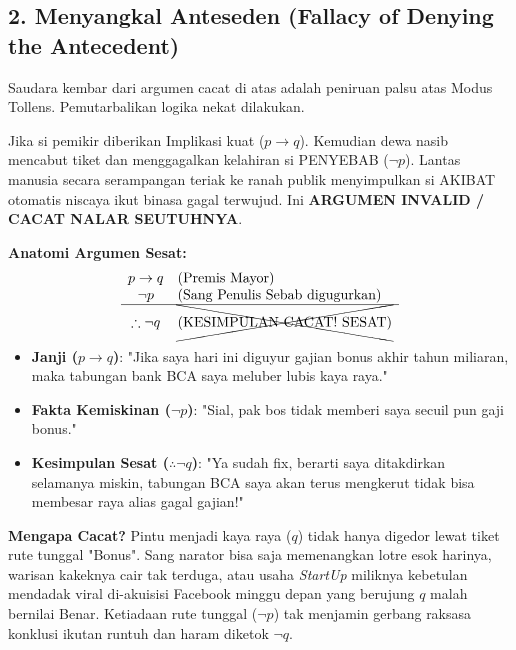 \subsection{2. Menyangkal Anteseden (Fallacy of Denying the Antecedent)}

Saudara kembar dari argumen cacat di atas adalah peniruan palsu atas Modus Tollens. Pemutarbalikan logika nekat dilakukan.

\begin{teorema}
Jika si pemikir diberikan Implikasi kuat ($p \rightarrow q$). Kemudian dewa nasib mencabut tiket dan menggagalkan kelahiran si PENYEBAB ($\neg p$). Lantas manusia secara serampangan teriak ke ranah publik menyimpulkan si AKIBAT otomatis niscaya ikut binasa gagal terwujud. Ini \textbf{ARGUMEN INVALID / CACAT NALAR SEUTUHNYA}.
\end{teorema}

\textbf{Anatomi Argumen Sesat:}
\[
\begin{array}{cl}
p \rightarrow q & \text{(Premis Mayor)} \\
\neg p & \text{(Sang Penulis Sebab digugurkan)} \\
\hline
\therefore \neg q & \text{\xcancel{(KESIMPULAN CACAT! SESAT)}}
\end{array}
\]

\begin{contoh}
\begin{itemize}
    \item \textbf{Janji ($p \rightarrow q$)}: "Jika saya hari ini diguyur gajian bonus akhir tahun miliaran, maka tabungan bank BCA saya meluber lubis kaya raya."
    \item \textbf{Fakta Kemiskinan ($\neg p$)}: "Sial, pak bos tidak memberi saya secuil pun gaji bonus."
    \item \textbf{Kesimpulan Sesat ($\therefore \neg q$)}: "Ya sudah fix, berarti saya ditakdirkan selamanya miskin, tabungan BCA saya akan terus mengkerut tidak bisa membesar raya alias gagal gajian!"
\end{itemize}
\textbf{Mengapa Cacat?} Pintu menjadi kaya raya ($q$) tidak hanya digedor lewat tiket rute tunggal "Bonus". Sang narator bisa saja memenangkan lotre esok harinya, warisan kakeknya cair tak terduga, atau usaha \textit{StartUp} miliknya kebetulan mendadak viral di-akuisisi Facebook minggu depan yang berujung $q$ malah bernilai Benar. Ketiadaan rute tunggal ($\neg p$) tak menjamin gerbang raksasa konklusi ikutan runtuh dan haram diketok $\neg q$.
\end{contoh}
